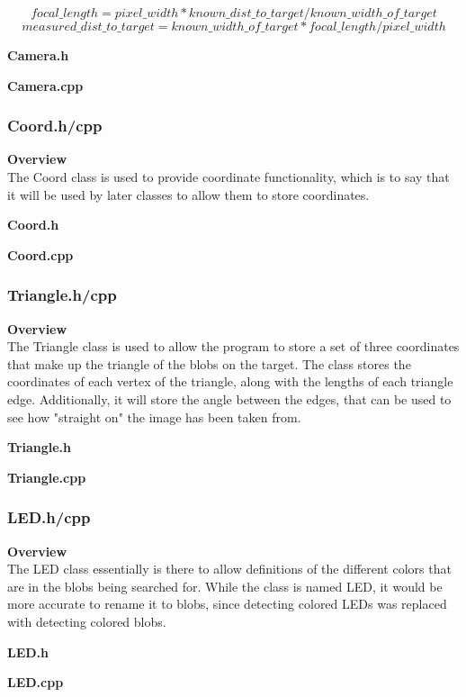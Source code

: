 \[focal\_length = pixel\_width * known\_dist\_to\_target / known\_width\_of\_target \]
\[measured\_dist\_to\_target = known\_width\_of\_target * focal\_length / pixel\_width \]

\large{\textbf{Camera.h}}

\large{\textbf{Camera.cpp}}


\subsubsection{Coord.h/cpp}
\large{\textbf{Overview}}\\
\normalsize
\noindent The Coord class is used to provide coordinate functionality, which is to say that it will be used by later classes to allow them to store coordinates.

\large{\textbf{Coord.h}}

\large{\textbf{Coord.cpp}}



\subsubsection{Triangle.h/cpp}
\large{\textbf{Overview}}\\
\normalsize
\noindent The Triangle class is used to allow the program to store a set of three coordinates that make up the triangle of the blobs on the target. The class stores the coordinates of each vertex of the triangle, along with the lengths of each triangle edge. Additionally, it will store the angle between the edges, that can be used to see how "straight on" the image has been taken from.

\large{\textbf{Triangle.h}}

\large{\textbf{Triangle.cpp}}


\subsubsection{LED.h/cpp}
\large{\textbf{Overview}}\\
\normalsize
\noindent The LED class essentially is there to allow definitions of the different colors that are in the blobs being searched for. While the class is named LED, it would be more accurate to rename it to blobs, since detecting colored LEDs was replaced with detecting colored blobs.

\large{\textbf{LED.h}}

\large{\textbf{LED.cpp}}



